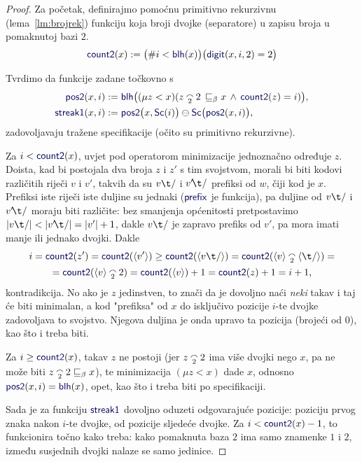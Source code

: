 \begin{proof}
Za početak, definirajmo pomoćnu primitivno rekurzivnu (lema~\ref{lm:brojrek}) funkciju koja broji dvojke (separatore) u zapisu broja u pomaknutoj bazi $2$.
\begin{equation}
    \f{count2}(x):=\bigl(\#i<\f{blh}(x)\bigr)\bigl(\f{digit}(x,i,2)=2\bigr)
\end{equation}

Tvrdimo da funkcije zadane točkovno s
\begin{align}
    \f{pos2}(x,i)&:=\f{blh}\bigl((\mu z<x)(z\conc22\,\sqsubseteq_\beta x\,\land\,\f{count2}(z)=i)\bigr),\\
    \f{streak1}(x,i)&:=\f{pos2}\bigl(x,\f{Sc}(i)\bigr)\ominus\f{Sc}\bigl(\f{pos2}(x,i)\bigr),
\end{align}
zadovoljavaju tražene specifikacije (očito su primitivno rekurzivne).

Za $i<\f{count2}(x)$, uvjet pod operatorom minimizacije jednoznačno određuje $z$. Doista, kad bi postojala dva broja $z$ i $z'$ s tim svojstvom, morali bi biti kodovi različitih riječi $v$ i $v'$, takvih da su $v\t/$ i $v'\!\t/$ prefiksi od $w$, čiji kod je $x$. Prefiksi iste riječi iste duljine su jednaki ($\f{prefix}$ je funkcija), pa duljine od $v\t/$ i $v'\!\t/$ moraju biti različite: bez smanjenja općenitosti pretpostavimo $\dulj{v\t/}<\dulj{v'\!\t/}=\dulj{v'}+1$, dakle $v\t/$ je zapravo prefiks od $v'$, pa mora imati manje ili jednako dvojki. Dakle
\begin{multline}
    i=\f{count2}(z')=\f{count2}(\kr{v'})\ge\f{count2}(\kr{v\t/})=\f{count2}(\kr v\conc2\kr{\t/})=\\
    =\f{count2}(\kr v\conc22)=\f{count2}(\kr v)+1=\f{count2}(z)+1=i+1\text,
\end{multline}
kontradikcija. No ako je $z$ jedinstven, to znači da je dovoljno naći \emph{neki} takav i taj će biti minimalan, a kod "prefiksa" od $x$ do isključivo pozicije $i$-te dvojke zadovoljava to svojstvo. Njegova duljina je onda upravo ta pozicija (brojeći od $0$), kao što i treba biti.

Za $i\ge\f{count2}(x)$, takav $z$ ne postoji (jer $z\conc22$ ima više dvojki nego $x$, pa ne može biti $z\conc22\sqsubseteq_\beta x$), te minimizacija $(\mu z<x)$ dade $x$, odnosno $\f{pos2}(x,i)=\f{blh}(x)$, opet, kao što i treba biti po specifikaciji.

Sada je za funkciju $\f{streak1}$ dovoljno oduzeti odgovarajuće pozicije: poziciju prvog znaka nakon $i$-te dvojke, od pozicije sljedeće dvojke. Za $i<\f{count2}(x)-1$, to funkcionira točno kako treba: kako pomaknuta baza $2$ ima samo znamenke $1$ i $2$, između susjednih dvojki nalaze se samo jedinice.


\end{proof}
